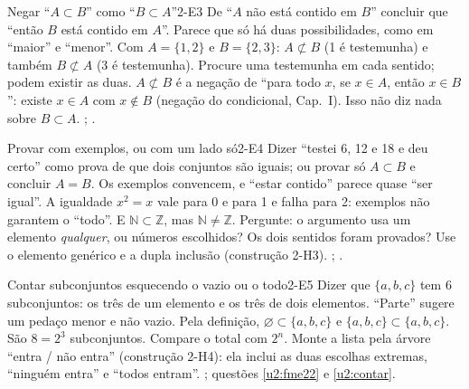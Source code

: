 \begin{erro}{Negar \enquote{$A\subset B$} como \enquote{$B\subset A$}}{2-E3}
 De \enquote{$A$ não está contido em $B$} concluir que \enquote{então $B$ está contido em $A$}.
 Parece que só há duas possibilidades, como em \enquote{maior} e \enquote{menor}.
 Com $A=\{1,2\}$ e $B=\{2,3\}$: $A\not\subset B$ (1 é testemunha) e também $B\not\subset A$ (3 é testemunha).
 Procure uma testemunha em cada sentido; podem existir as duas.
 $A\not\subset B$ é a negação de \enquote{para todo $x$, se $x\in A$, então $x\in B$}: existe $x\in A$ com $x\notin B$ (negação do condicional, Cap.~I). Isso não diz nada sobre $B\subset A$.
 ; .
\end{erro}

\begin{erro}{Provar com exemplos, ou com um lado só}{2-E4}
 Dizer \enquote{testei 6, 12 e 18 e deu certo} como prova de que dois conjuntos são iguais; ou provar só $A\subset B$ e concluir $A=B$.
 Os exemplos convencem, e \enquote{estar contido} parece quase \enquote{ser igual}.
 A igualdade $x^2=x$ vale para 0 e para 1 e falha para 2: exemplos não garantem o \enquote{todo}. E $\mathbb{N}\subset\mathbb{Z}$, mas $\mathbb{N}\neq\mathbb{Z}$.
 Pergunte: o argumento usa um elemento \emph{qualquer}, ou números escolhidos? Os dois sentidos foram provados?
 Use o elemento genérico e a dupla inclusão (construção 2-H3).
 ; .
\end{erro}

\begin{erro}{Contar subconjuntos esquecendo o vazio ou o todo}{2-E5}
 Dizer que $\{a,b,c\}$ tem 6 subconjuntos: os três de um elemento e os três de dois elementos.
 \enquote{Parte} sugere um pedaço menor e não vazio.
 Pela definição, $\varnothing\subset\{a,b,c\}$ e $\{a,b,c\}\subset\{a,b,c\}$. São $8=2^3$ subconjuntos.
 Compare o total com $2^n$.
 Monte a lista pela árvore \enquote{entra / não entra} (construção 2-H4): ela inclui as duas escolhas extremas, \enquote{ninguém entra} e \enquote{todos entram}.
 ; questões \ref{u2:fme22} e \ref{u2:contar}.
\end{erro}

